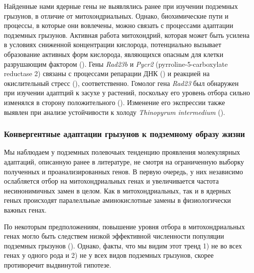 Найденные нами ядерные гены не выявлялись ранее при изучении подземных грызунов, в отличие от митохондриальных. Однако, биохимические пути и процессы, в которые они вовлечены, можно связать с процессами адаптации подземных грызунов. Активная работа митохондрий, которая может быть усилена в условиях сниженной концентрации кислорода, потенциально вызывает образование активных форм кислорода, являющихся опасным для клетки разрушающим фактором (\cite{Turrens2003}). Гены \textit{Rad23b} и \textit{Pycr2} (pyrroline-5-carboxylate reductase 2) связаны с процессами репарации ДНК (\cite{Pohjoismaki2012}) и реакцией на окислительный стресс (\cite{Kuo2015}), соответственно. Гомолог гена \textit{Rad23} был обнаружен при изучении адаптций к засухе у растений, поскольку его уровень отбора сильно изменялся в сторону положительного (\cite{Zhang2013b}). Изменение его экспрессии также выявлен при анализе устойчивости к холоду \textit{Thinopyrum intermedium} (\cite{Jaikumar2020}). 

\subsubsection*{Конвергентные адаптации грызунов к подземному образу жизни}
Мы наблюдаем у подземных полевочьих тенденцию проявления молекулярных адаптаций, описанную ранее в литературе, не смотря на ограниченную выборку полученных и проанализированных генов. В первую очередь, у них независимо ослабляется отбор на митохондриальных генах и увеличивается частота несинонимичных замен в целом. Как в митохондриальных, так и в ядерных геных происходят паралелльные аминокислотные замены в физиологически важных генах. 

По некоторым предположениям, повышение уровня отбора в митохондриальных генах могло быть следствем низкой эффективной численности популяции подземных грызунов (\cite{Lacey2000}). Однако, факты, что мы видим этот тренд 1) не во всех генах у одного рода и 2) не у всех видов подземных грызунов, скорее противоречит выдвинутой гипотезе. 

